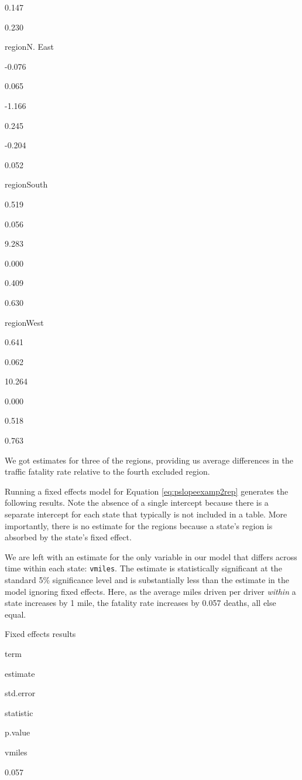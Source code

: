 \documentclass[
]{book}
\begin{document}
0.147

0.230

regionN. East

-0.076

0.065

-1.166

0.245

-0.204

0.052

regionSouth

0.519

0.056

9.283

0.000

0.409

0.630

regionWest

0.641

0.062

10.264

0.000

0.518

0.763

We got estimates for three of the regions, providing us average differences in the traffic fatality rate relative to the fourth excluded region.

Running a fixed effects model for Equation \eqref{eq:pslopeexamp2rep} generates the following results. Note the absence of a single intercept because there is a separate intercept for each state that typically is not included in a table. More importantly, there is no estimate for the regions because a state's region is absorbed by the state's fixed effect.

We are left with an estimate for the only variable in our model that differs across time within each state: \texttt{vmiles}. The estimate is statistically significant at the standard 5\% significance level and is substantially less than the estimate in the model ignoring fixed effects. Here, as the average miles driven per driver \emph{within} a state increases by 1 mile, the fatality rate increases by 0.057 deaths, all else equal.

\label{tab:unnamed-chunk-95}Fixed effects results

term

estimate

std.error

statistic

p.value

vmiles

0.057
\end{document}
